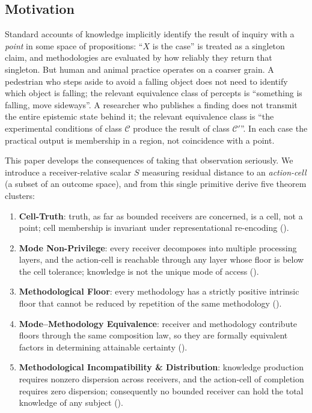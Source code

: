 \documentclass[twocolumn,11pt,a4paper]{article}
\newcommand{\Cell}{\mathcal{C}}
\begin{document}
\subsection{Motivation}

Standard accounts of knowledge implicitly identify the result of inquiry with
a \emph{point} in some space of propositions: ``$X$ is the case'' is treated
as a singleton claim, and methodologies are evaluated by how reliably they
return that singleton. But human and animal practice operates on a coarser
grain. A pedestrian who steps aside to avoid a falling object does not need
to identify which object is falling; the relevant equivalence class of
percepts is ``something is falling, move sideways''. A researcher who
publishes a finding does not transmit the entire epistemic state behind it;
the relevant equivalence class is ``the experimental conditions of class
$\Cell$ produce the result of class $\Cell'$''. In each case the practical
output is membership in a region, not coincidence with a point.

This paper develops the consequences of taking that observation seriously. We
introduce a receiver-relative scalar $S$ measuring residual distance to an
\emph{action-cell} (a subset of an outcome space), and from this single
primitive derive five theorem clusters:
\begin{enumerate}[label=(\roman*),leftmargin=*]
\item \textbf{Cell-Truth}: truth, as far as bounded receivers are concerned,
is a cell, not a point; cell membership is invariant under representational
re-encoding ().
\item \textbf{Mode Non-Privilege}: every receiver decomposes into multiple
processing layers, and the action-cell is reachable through any layer whose
floor is below the cell tolerance; knowledge is not the unique mode of
access ().
\item \textbf{Methodological Floor}: every methodology has a strictly
positive intrinsic floor that cannot be reduced by repetition of the same
methodology ().
\item \textbf{Mode--Methodology Equivalence}: receiver and methodology
contribute floors through the same composition law, so they are formally
equivalent factors in determining attainable certainty ().
\item \textbf{Methodological Incompatibility \& Distribution}: knowledge
production requires nonzero dispersion across receivers, and the action-cell
of completion requires zero dispersion; consequently no bounded receiver can
hold the total knowledge of any subject ().
\end{enumerate}
\end{document}
